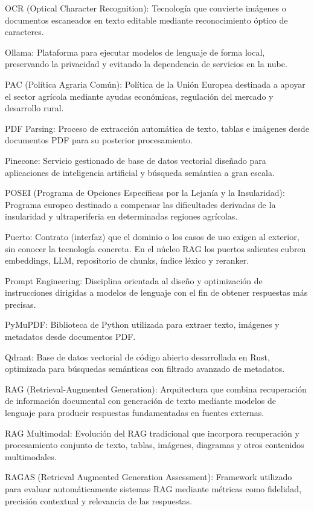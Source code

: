 OCR (Optical Character Recognition): Tecnología que convierte imágenes o documentos escaneados en texto editable mediante reconocimiento óptico de caracteres.

Ollama: Plataforma para ejecutar modelos de lenguaje de forma local, preservando la privacidad y evitando la dependencia de servicios en la nube.

PAC (Política Agraria Común): Política de la Unión Europea destinada a apoyar el sector agrícola mediante ayudas económicas, regulación del mercado y desarrollo rural.

PDF Parsing: Proceso de extracción automática de texto, tablas e imágenes desde documentos PDF para su posterior procesamiento.

Pinecone: Servicio gestionado de base de datos vectorial diseñado para aplicaciones de inteligencia artificial y búsqueda semántica a gran escala.

POSEI (Programa de Opciones Específicas por la Lejanía y la Insularidad): Programa europeo destinado a compensar las dificultades derivadas de la insularidad y ultraperiferia en determinadas regiones agrícolas.

Puerto: Contrato (interfaz) que el dominio o los casos de uso exigen al exterior, sin conocer la tecnología concreta. En el núcleo RAG los puertos salientes cubren embeddings, LLM, repositorio de chunks, índice léxico y reranker.

Prompt Engineering: Disciplina orientada al diseño y optimización de instrucciones dirigidas a modelos de lenguaje con el fin de obtener respuestas más precisas.

PyMuPDF: Biblioteca de Python utilizada para extraer texto, imágenes y metadatos desde documentos PDF.

Qdrant: Base de datos vectorial de código abierto desarrollada en Rust, optimizada para búsquedas semánticas con filtrado avanzado de metadatos.

RAG (Retrieval-Augmented Generation): Arquitectura que combina recuperación de información documental con generación de texto mediante modelos de lenguaje para producir respuestas fundamentadas en fuentes externas.

RAG Multimodal: Evolución del RAG tradicional que incorpora recuperación y procesamiento conjunto de texto, tablas, imágenes, diagramas y otros contenidos multimodales.

RAGAS (Retrieval Augmented Generation Assessment): Framework utilizado para evaluar automáticamente sistemas RAG mediante métricas como fidelidad, precisión contextual y relevancia de las respuestas.

